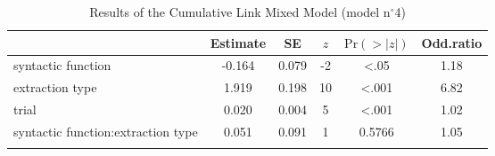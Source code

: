 \begin{table}
\begin{tabularx}{\textwidth}{Q S[table-format=-1.3] S[table-format=1.3] S[table-format=-1] S[table-format=<1.3] S[table-format=1.2]}
  \lsptoprule
 & {Estimate} & {SE} & {$z$} & {$\text{Pr}(>|z|)$} & {Odd.ratio} \\ 
  \midrule
  syntactic function & -0.164 & 0.079 & -2 & <.05 & 1.18 \\ 
  extraction type & 1.919 & 0.198 & 10 & <.001 & 6.82 \\ 
  trial & 0.020 & 0.004 & 5 & <.001 & 1.02 \\ 
  syntactic function:extraction type & 0.051 & 0.091 & 1 & 0.5766 & 1.05 \\ 
   \lspbottomrule
\end{tabularx}
\caption{Results of the Cumulative Link Mixed Model (model n$^{\circ}$4)}
\label{tab:exp04-m4}
\end{table}
